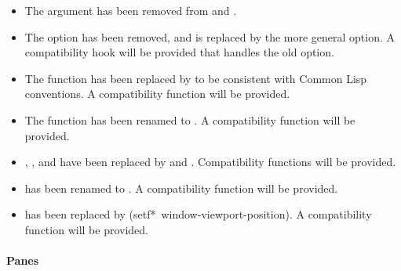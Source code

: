 \begin{itemize}
\item The  argument has been removed from  and
.

\item The  option has been removed, and is replaced by the more
general  option.  A compatibility hook will be provided that
handles the old  option.

\item The function  has been replaced by
 to be consistent with Common Lisp conventions.
A compatibility function will be provided.

\item The function  has been renamed to
.  A compatibility function will be provided.

\item {}, , and 
have been replaced by  and .
Compatibility functions will be provided.

\item {} has been renamed to
.  A compatibility function will be provided.

\item {} has been replaced by
{(setf*~window-viewport-position)}.  A compatibility function will be provided.
\end{itemize}


\paragraph {Panes}

